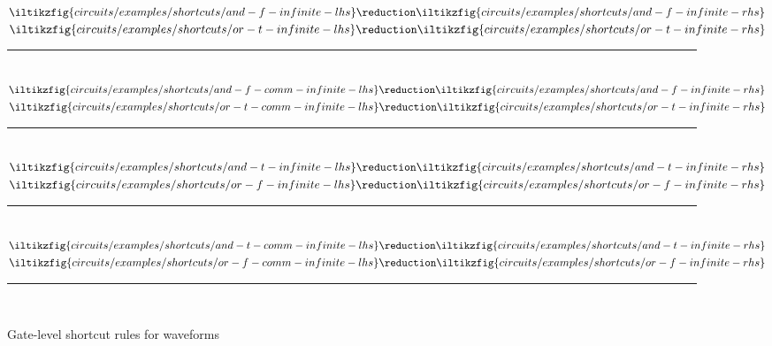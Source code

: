 \documentclass{lmcs}
\begin{document}
\begin{figure}
    \centering
    \(
    \iltikzfig{circuits/examples/shortcuts/and-f-infinite-lhs}
    \reduction
    \iltikzfig{circuits/examples/shortcuts/and-f-infinite-rhs}
    \)
    \quad
    \(
    \iltikzfig{circuits/examples/shortcuts/or-t-infinite-lhs}
    \reduction
    \iltikzfig{circuits/examples/shortcuts/or-t-infinite-rhs}
    \)
    \\[0.3em]
    \rule{\textwidth}{0.1mm}
    \\[0.5em]
    \(
    \iltikzfig{circuits/examples/shortcuts/and-f-comm-infinite-lhs}
    \reduction
    \iltikzfig{circuits/examples/shortcuts/and-f-infinite-rhs}
    \)
    \quad
    \(
    \iltikzfig{circuits/examples/shortcuts/or-t-comm-infinite-lhs}
    \reduction
    \iltikzfig{circuits/examples/shortcuts/or-t-infinite-rhs}
    \)
    \\[0.3em]
    \rule{\textwidth}{0.1mm}
    \\[0.5em]
    \(
    \iltikzfig{circuits/examples/shortcuts/and-t-infinite-lhs}
    \reduction
    \iltikzfig{circuits/examples/shortcuts/and-t-infinite-rhs}
    \)
    \quad
    \(
    \iltikzfig{circuits/examples/shortcuts/or-f-infinite-lhs}
    \reduction
    \iltikzfig{circuits/examples/shortcuts/or-f-infinite-rhs}
    \)
    \\[0.3em]
    \rule{\textwidth}{0.1mm}
    \\[0.5em]
    \(
    \iltikzfig{circuits/examples/shortcuts/and-t-comm-infinite-lhs}
    \reduction
    \iltikzfig{circuits/examples/shortcuts/and-t-infinite-rhs}
    \)
    \quad
    \(
    \iltikzfig{circuits/examples/shortcuts/or-f-comm-infinite-lhs}
    \reduction
    \iltikzfig{circuits/examples/shortcuts/or-f-infinite-rhs}
    \)
    \\[0.3em]
    \rule{\textwidth}{0.1mm}
    \\[0.5em]
    \caption{Gate-level shortcut rules for waveforms}
    \label{fig:shortcut-waveform-rules}
\end{figure}
\end{document}
